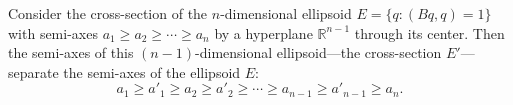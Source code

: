 Consider the cross-section of the $n$-dimensional ellipsoid $E = \{q : (Bq, q) = 1\}$ with semi-axes $a_1 \geq a_2 \geq \cdots \geq a_n$ by a hyperplane $\mathbb{R}^{n-1}$ through its center. Then the semi-axes of this $(n-1)$-dimensional ellipsoid---the cross-section $E'$---separate the semi-axes of the ellipsoid $E$:
$$a_1 \geq a'_1 \geq a_2 \geq a'_2 \geq \cdots \geq a_{n-1} \geq a'_{n-1} \geq a_n.$$

